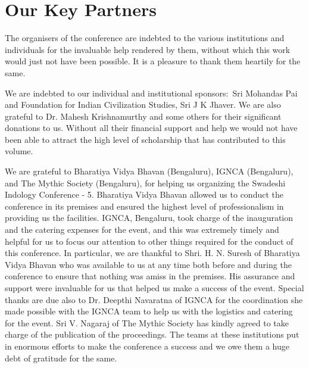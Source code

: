 
\chapter*{Our Key Partners}\label{keypartners}

\vspace{-.5cm}

The organisers of the conference are indebted to the various institutions and individuals for the invaluable help rendered by them, without which this work would just not have been possible. It is a pleasure to thank them heartily for the same.

We are indebted to our individual and institutional sponsors:~Sri Mohandas Pai and Foundation for Indian Civilization Studies, Sri J K Jhaver. We are also grateful to Dr. Mahesh Krishnamurthy and some others for their significant donations to us. Without all their financial support and help we would not have been able to attract the high level of scholarship that has contributed to this volume.

We are grateful to Bharatiya Vidya Bhavan (Bengaluru), IGNCA (Bengaluru), and The Mythic Society (Bengaluru), for helping us organizing the Swadeshi Indology Conference - 5. Bharatiya Vidya Bhavan allowed us to conduct the conference in its premises and ensured the highest level of professionalism in providing us the facilities. IGNCA, Bengaluru, took charge of the inauguration and the catering expenses for the event, and this was extremely timely and helpful for us to focus our attention to other things required for the conduct of this conference. In particular, we are thankful to Shri. H. N. Suresh of Bharatiya Vidya Bhavan who was available to us at any time both before and during the conference to ensure that nothing was amiss in the premises. His assurance and support were invaluable for us that helped us make a success of the event. Special thanks are due also to Dr. Deepthi Navaratna of IGNCA for the coordination she made possible with the IGNCA team to help us with the logistics and catering for the event. Sri V. Nagaraj of The Mythic Society has kindly agreed to take charge of the publication of the proceedings. The teams at these institutions put in enormous efforts to make the conference a success and we owe them a huge debt of gratitude for the same. 

